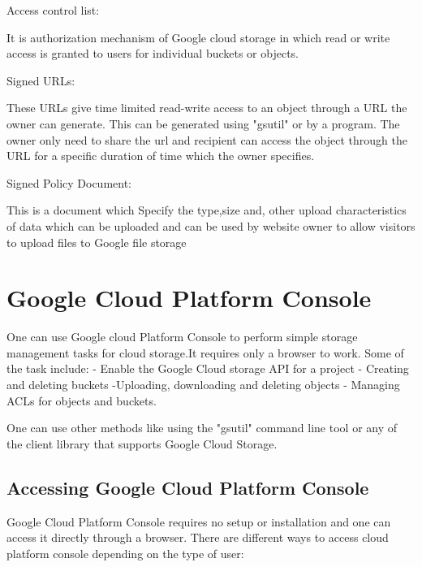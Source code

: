 \documentclass[9pt,twocolumn,twoside]{../../styles/osajnl}
\begin{document}
\begin{flushleft}
Access control list:

 It is authorization mechanism of Google cloud storage in which read or write access is granted to users for individual buckets or objects.

\end{flushleft}


\begin{flushleft}
Signed URLs:
 
These URLs give time limited read-write access to an object through a URL the owner can generate. This can be generated using "gsutil" or by a program. The owner only need to share the url and recipient can access the object through the URL for a specific duration of time which the owner specifies.

\end{flushleft}


\begin{flushleft}
Signed Policy Document:

This is a document which Specify the type,size and, other upload characteristics of data which can be uploaded and can be used by website owner to allow visitors to upload files to Google file storage
\end{flushleft}



\section{Google Cloud Platform Console }

One can use Google cloud Platform Console to perform simple storage management tasks for cloud storage.It requires only a browser to work. Some of the task include:
- Enable the Google Cloud storage API for a project
- Creating and deleting buckets 
-Uploading, downloading and deleting objects
- Managing ACLs for objects and buckets.


One can use other methods like using the "gsutil" command line tool or any of the client library that supports Google Cloud Storage.

\subsection{Accessing Google Cloud Platform Console}


Google Cloud Platform Console requires no setup or installation and one can access it directly through a browser. There are different ways to access cloud platform console depending on the type of user:
\end{document}
